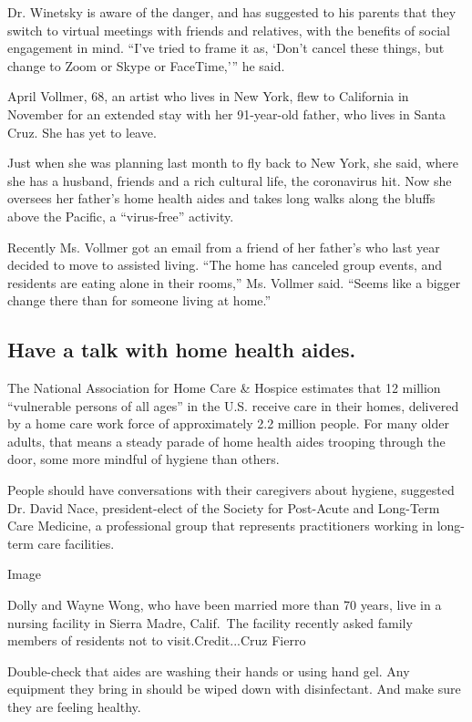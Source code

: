 Dr. Winetsky is aware of the danger, and has suggested to his parents
that they switch to virtual meetings with friends and relatives, with
the benefits of social engagement in mind. ``I've tried to frame it as,
`Don't cancel these things, but change to Zoom or Skype or FaceTime,'''
he said.

April Vollmer, 68, an artist who lives in New York, flew to California
in November for an extended stay with her 91-year-old father, who lives
in Santa Cruz. She has yet to leave.

Just when she was planning last month to fly back to New York, she said,
where she has a husband, friends and a rich cultural life, the
coronavirus hit. Now she oversees her father's home health aides and
takes long walks along the bluffs above the Pacific, a ``virus-free''
activity.

Recently Ms. Vollmer got an email from a friend of her father's who last
year decided to move to assisted living. ``The home has canceled group
events, and residents are eating alone in their rooms,'' Ms. Vollmer
said. ``Seems like a bigger change there than for someone living at
home.''

\hypertarget{have-a-talk-with-home-health-aides}{%
\subsection{Have a talk with home health
aides.}\label{have-a-talk-with-home-health-aides}}

The National Association for Home Care \& Hospice estimates that 12
million ``vulnerable persons of all ages'' in the U.S. receive care in
their homes, delivered by a home care work force of approximately 2.2
million people. For many older adults, that means a steady parade of
home health aides trooping through the door, some more mindful of
hygiene than others.

People should have conversations with their caregivers about hygiene,
suggested Dr. David Nace, president-elect of the Society for Post-Acute
and Long-Term Care Medicine, a professional group that represents
practitioners working in long-term care facilities.

Image

Dolly and Wayne Wong, who have been married more than 70 years, live in
a nursing facility in Sierra Madre, Calif.~The facility recently asked
family members of residents not to visit.Credit...Cruz Fierro

Double-check that aides are washing their hands or using hand gel. Any
equipment they bring in should be wiped down with disinfectant. And make
sure they are feeling healthy.


